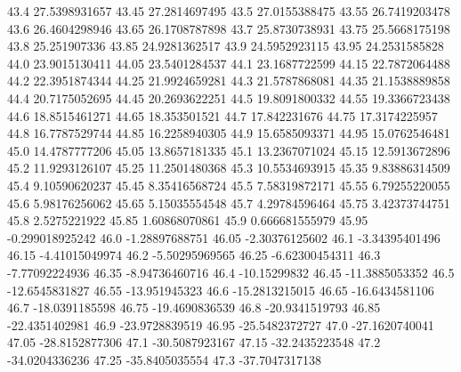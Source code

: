            43.4    27.5398931657
          43.45    27.2814697495
           43.5    27.0155388475
          43.55    26.7419203478
           43.6    26.4604298946
          43.65    26.1708787898
           43.7    25.8730738931
          43.75    25.5668175198
           43.8     25.251907336
          43.85    24.9281362517
           43.9    24.5952923115
          43.95    24.2531585828
           44.0    23.9015130411
          44.05    23.5401284537
           44.1    23.1687722599
          44.15    22.7872064488
           44.2    22.3951874344
          44.25    21.9924659281
           44.3    21.5787868081
          44.35    21.1538889858
           44.4    20.7175052695
          44.45    20.2693622251
           44.5    19.8091800332
          44.55    19.3366723438
           44.6    18.8515461271
          44.65     18.353501521
           44.7     17.842231676
          44.75    17.3174225957
           44.8    16.7787529744
          44.85    16.2258940305
           44.9    15.6585093371
          44.95    15.0762546481
           45.0    14.4787777206
          45.05    13.8657181335
           45.1    13.2367071024
          45.15    12.5913672896
           45.2    11.9293126107
          45.25    11.2501480368
           45.3    10.5534693915
          45.35    9.83886314509
           45.4    9.10590620237
          45.45    8.35416568724
           45.5    7.58319872171
          45.55    6.79255220055
           45.6    5.98176256062
          45.65    5.15035554548
           45.7    4.29784596464
          45.75    3.42373744751
           45.8     2.5275221922
          45.85    1.60868070861
           45.9   0.666681555979
          45.95  -0.299018925242
           46.0   -1.28897688751
          46.05   -2.30376125602
           46.1   -3.34395401496
          46.15   -4.41015049974
           46.2   -5.50295969565
          46.25   -6.62300454311
           46.3   -7.77092224936
          46.35   -8.94736460716
           46.4     -10.15299832
          46.45   -11.3885053352
           46.5   -12.6545831827
          46.55    -13.951945323
           46.6   -15.2813215015
          46.65   -16.6434581106
           46.7   -18.0391185598
          46.75   -19.4690836539
           46.8   -20.9341519793
          46.85   -22.4351402981
           46.9   -23.9728839519
          46.95   -25.5482372727
           47.0   -27.1620740041
          47.05   -28.8152877306
           47.1   -30.5087923167
          47.15   -32.2435223548
           47.2   -34.0204336236
          47.25   -35.8405035554
           47.3   -37.7047317138
